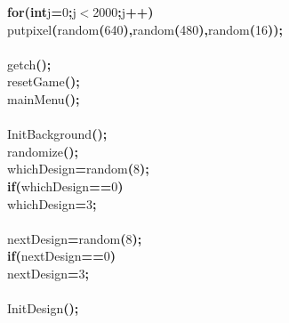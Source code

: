 \documentclass[a4paper, 10pt]{article}
\newcommand\SPC{\hspace*{0.6em}}
\newcommand{\CppAIdentifier}[1]{#1}
\newcommand{\CppANumber}[1]{\textcolor[rgb]{0.5,0,0.5}{#1}}
\newcommand{\CppAReservedWord}[1]{\textbf{#1}}
\newcommand{\CppASpace}[1]{\colorbox[rgb]{1,1,1}{#1}}
\newcommand{\CppASymbol}[1]{\textbf{\textcolor[rgb]{1,0,0}{#1}}}
\begin{document}
\begin{ttfamily}
\CppASpace{\SPC \SPC }\CppAReservedWord{for}\CppASymbol{(}\CppAReservedWord{int}\CppASpace{\SPC }\CppAIdentifier{j}\CppASymbol{=}\CppANumber{0}\CppASymbol{;}\CppAIdentifier{j}\CppASymbol{$<$}\CppANumber{2000}\CppASymbol{;}\CppAIdentifier{j}\CppASymbol{++}\CppASymbol{)}\\
\CppASpace{\SPC \SPC \SPC }\CppAIdentifier{putpixel}\CppASymbol{(}\CppAIdentifier{random}\CppASymbol{(}\CppANumber{640}\CppASymbol{)}\CppASymbol{,}\CppAIdentifier{random}\CppASymbol{(}\CppANumber{480}\CppASymbol{)}\CppASymbol{,}\CppAIdentifier{random}\CppASymbol{(}\CppANumber{16}\CppASymbol{)}\CppASymbol{)}\CppASymbol{;}\\
\\
\CppASpace{\SPC \SPC }\CppAIdentifier{getch}\CppASymbol{(}\CppASymbol{)}\CppASymbol{;}\\
\CppASpace{\SPC \SPC }\CppAIdentifier{resetGame}\CppASymbol{(}\CppASymbol{)}\CppASymbol{;}\\
\CppASpace{\SPC \SPC }\CppAIdentifier{mainMenu}\CppASymbol{(}\CppASymbol{)}\CppASymbol{;}\\
\\
\CppASpace{\SPC \SPC }\CppAIdentifier{InitBackground}\CppASymbol{(}\CppASymbol{)}\CppASymbol{;}\\
\CppASpace{\SPC \SPC }\CppAIdentifier{randomize}\CppASymbol{(}\CppASymbol{)}\CppASymbol{;}\\
\CppASpace{\SPC \SPC }\CppAIdentifier{whichDesign}\CppASymbol{=}\CppAIdentifier{random}\CppASymbol{(}\CppANumber{8}\CppASymbol{)}\CppASymbol{;}\\
\CppASpace{\SPC \SPC }\CppAReservedWord{if}\CppASymbol{(}\CppAIdentifier{whichDesign}\CppASymbol{==}\CppANumber{0}\CppASymbol{)}\\
\CppASpace{\SPC \SPC \SPC }\CppAIdentifier{whichDesign}\CppASymbol{=}\CppANumber{3}\CppASymbol{;}\\
\\
\CppASpace{\SPC \SPC }\CppAIdentifier{nextDesign}\CppASymbol{=}\CppAIdentifier{random}\CppASymbol{(}\CppANumber{8}\CppASymbol{)}\CppASymbol{;}\\
\CppASpace{\SPC \SPC }\CppAReservedWord{if}\CppASymbol{(}\CppAIdentifier{nextDesign}\CppASymbol{==}\CppANumber{0}\CppASymbol{)}\\
\CppASpace{\SPC \SPC \SPC }\CppAIdentifier{nextDesign}\CppASymbol{=}\CppANumber{3}\CppASymbol{;}\\
\\
\CppASpace{\SPC \SPC }\CppAIdentifier{InitDesign}\CppASymbol{(}\CppASymbol{)}\CppASymbol{;}\\

\end{ttfamily}
\end{document}

